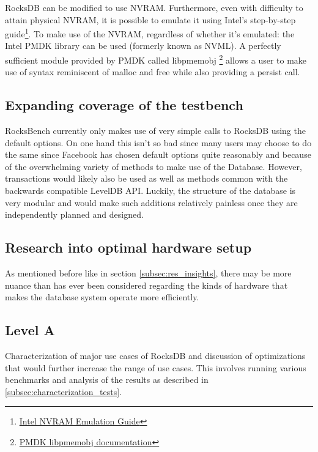 \documentclass[twocolumn,11pt]{article}
\begin{document}
RocksDB can be modified to use NVRAM. Furthermore, even with difficulty to
attain physical NVRAM, it is possible to emulate it using Intel's step-by-step
guide\footnote{
  \href{https://software.intel.com/en-us/articles/how-to-emulate-persistent-memory-on-an-intel-architecture-server/}
  {Intel NVRAM Emulation Guide}}.
To make use of the NVRAM, regardless of whether it's emulated: the Intel PMDK
library can be used (formerly known as NVML). A perfectly sufficient module
provided by PMDK called libpmemobj
\footnote{\href{http://pmem.io/pmdk/libpmemobj/}
{PMDK libpmemobj documentation}} allows a user to make use of syntax reminiscent
of malloc and free while also providing a persist call.

\subsection{Expanding coverage of the testbench}

RocksBench currently only makes use of very simple calls to RocksDB using the
default options. On one hand this isn't so bad since many users may choose to do
the same since Facebook has chosen default options quite reasonably and because
of the overwhelming variety of methods to make use of the Database. However,
transactions would likely also be used as well as methods common with the
backwards compatible LevelDB API. Luckily, the structure of the database is very
modular and would make such additions relatively painless once they are
independently planned and designed.

\subsection{Research into optimal hardware setup}

As mentioned before like in section \ref{subsec:res_insights}, there may be more
nuance than has ever been considered regarding the kinds of hardware that makes
the database system operate more efficiently.

\subsection{Level A}

Characterization of major use cases of RocksDB and discussion of optimizations
that would further increase the range of use cases. This involves running
various benchmarks and analysis of the results as described in
\ref{subsec:characterization_tests}.
\end{document}
